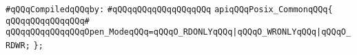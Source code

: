 \label{src/lib/std/src/posix/posix-common.api}
\newline
\verb|#qQQqCompiledqQQqby:|\newline
\verb|#qQQqqQQqqQQqqQQqqQQq|\newline
\newline
\verb|apiqQQqPosix_CommonqQQq{|\newline
\verb|qQQqqQQqqQQqqQQq#|\newline
\verb|qQQqqQQqqQQqqQQqOpen_ModeqQQq=qQQqO_RDONLYqQQq|\verb#|qQQqO_WRONLYqQQq|qQQqO_RDWR;#\newline
\verb|};|\newline


